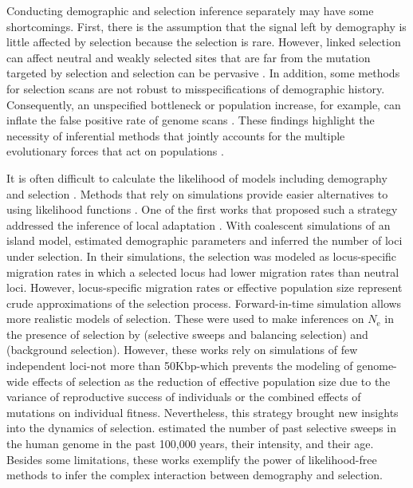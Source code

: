 \documentclass[a4paper, 12pt]{article}
\begin{document}
Conducting demographic and selection inference separately may have some shortcomings. First, there is the assumption that the signal left by demography is little affected by selection because the selection is rare. However, linked selection can affect neutral and weakly selected sites that are far from the mutation targeted by selection \citep{Sella:2009hs, Neher:2013ju} and selection can be pervasive \citep{Sella:2009hs, Lange:2018fl}. In addition, some methods for selection scans are not robust to misspecifications of demographic history. Consequently, an unspecified bottleneck or population increase, for example, can inflate the false positive rate of genome scans \citep{Jensen:2005ky, Jensen:2007jw, Schrider:2016gg}. These findings highlight the necessity of inferential methods that jointly accounts for the multiple evolutionary forces that act on populations \citep{Lin:2011jv, Li:2012bh, Bank:2014hx}. 
 
It is often difficult to calculate the likelihood of models including demography and selection \citep[but see][]{Vitalis:2014ja}. Methods that rely on simulations provide easier alternatives to using likelihood functions \citep{Csillery:2010jd, Schrider:2018ei}. One of the first works that proposed such a strategy addressed the inference of local adaptation \citep{Bazin:2010dv}. With coalescent simulations of an island model, \citet{Bazin:2010dv} estimated demographic parameters and inferred the number of loci under selection. In their simulations, the selection was modeled as locus-specific migration rates in which a selected locus had lower migration rates than neutral loci. However, locus-specific migration rates or effective population size \citep[as in][]{Roux:2016gm, Fraisse:2021gg} represent crude approximations of the selection process. Forward-in-time simulation allows more realistic models of selection. These were used to make inferences on $N_\mathrm{e}$ in the presence of selection by \citet{Sheehan:2016caa} (selective sweeps and balancing selection) and \citet{Johri:2020ee} (background selection). However, these works rely on simulations of few independent loci-not more than 50Kbp-which prevents the modeling of genome-wide effects of selection as the reduction of effective population size due to the variance of reproductive success of individuals \citep{Santiago:1995wx} or the combined effects of mutations on individual fitness.
Nevertheless, this strategy brought new insights into the dynamics of selection. \citet{Laval:2019jo} estimated the number of past selective sweeps in the human genome in the past 100,000 years, their intensity, and their age. Besides some limitations, these works exemplify the power of likelihood-free methods to infer the complex interaction between demography and selection.
\end{document}
